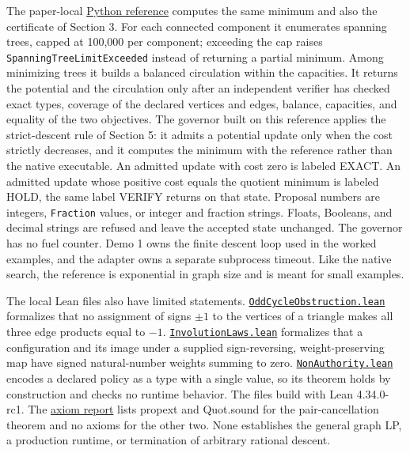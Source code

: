 \documentclass[
  11pt,
]{article}
\newcommand{\passthrough}[1]{#1}
\begin{document}
The paper-local
\href{../../001_pfp_discrete_cochain_retraction_and_toy_involutions/code/symbol_game_governor.py}{Python
reference} computes the same minimum and also the certificate of Section
3. For each connected component it enumerates spanning trees, capped at
100,000 per component; exceeding the cap raises
\passthrough{\lstinline!SpanningTreeLimitExceeded!} instead of returning
a partial minimum. Among minimizing trees it builds a balanced
circulation within the capacities. It returns the potential and the
circulation only after an independent verifier has checked exact types,
coverage of the declared vertices and edges, balance, capacities, and
equality of the two objectives. The governor built on this reference
applies the strict-descent rule of Section 5: it admits a potential
update only when the cost strictly decreases, and it computes the
minimum with the reference rather than the native executable. An
admitted update with cost zero is labeled EXACT. An admitted update
whose positive cost equals the quotient minimum is labeled HOLD, the
same label VERIFY returns on that state. Proposal numbers are integers,
\passthrough{\lstinline!Fraction!} values, or integer and fraction
strings. Floats, Booleans, and decimal strings are refused and leave the
accepted state unchanged. The governor has no fuel counter. Demo 1 owns
the finite descent loop used in the worked examples, and the adapter
owns a separate subprocess timeout. Like the native search, the
reference is exponential in graph size and is meant for small examples.

The local Lean files also have limited statements.
\href{../../001_pfp_discrete_cochain_retraction_and_toy_involutions/lean4/OddCycleObstruction.lean}{\mbox{\nolinkurl{OddCycleObstruction.lean}}}
formalizes that no assignment of signs \(\pm1\) to the vertices of a
triangle makes all three edge products equal to \(-1\).
\href{../../001_pfp_discrete_cochain_retraction_and_toy_involutions/lean4/InvolutionLaws.lean}{\mbox{\nolinkurl{InvolutionLaws.lean}}}
formalizes that a configuration and its image under a supplied
sign-reversing, weight-preserving map have signed natural-number weights
summing to zero.
\href{../../001_pfp_discrete_cochain_retraction_and_toy_involutions/lean4/NonAuthority.lean}{\mbox{\nolinkurl{NonAuthority.lean}}}
encodes a declared policy as a type with a single value, so its theorem
holds by construction and checks no runtime behavior. The files build
with Lean 4.34.0-rc1. The
\href{../../001_pfp_discrete_cochain_retraction_and_toy_involutions/lean4/axiom_report.txt}{axiom
report} lists propext and Quot.sound for the pair-cancellation theorem
and no axioms for the other two. None establishes the general graph LP,
a production runtime, or termination of arbitrary rational descent.
\end{document}
